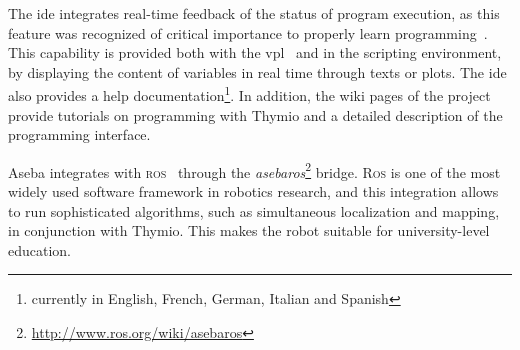 \documentclass[letterpaper, 10 pt, conference]{ieeeconf}  %
\begin{document}

The \ac{ide} integrates real-time feedback of the status of program execution, as this feature was recognized of critical importance to properly learn programming~\cite{sorva2013notional}.
This capability is provided both with the \ac{vpl}~\cite{Magnenat2015} and in the scripting environment, by displaying the content of variables in real time through texts or plots.
The \ac{ide} also provides a help documentation\footnote{currently in English, French, German, Italian and Spanish}.
In addition, the wiki pages of the project provide tutorials on programming with Thymio and a detailed description of the programming interface.

Aseba integrates with \textsc{ros}~\cite{quigley2009ros} through the \emph{asebaros}\footnote{\url{http://www.ros.org/wiki/asebaros}} bridge.
\textsc{Ros} is one of the most widely used software framework in robotics research, and this integration allows to run sophisticated algorithms, such as simultaneous localization and mapping, in conjunction with  Thymio.
This makes the robot suitable for university-level education.
\end{document}
